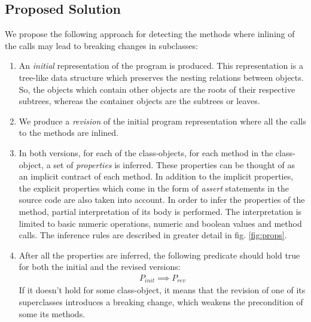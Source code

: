\subsection{Proposed Solution}
We propose the following approach for detecting the methods where inlining of the calls may lead to breaking changes in subclasses:
\begin{enumerate}
    \item An \textit{initial} representation of the program is produced. This representation is a tree-like data structure which preserves the nesting relations between objects. So, the objects which contain other objects are the roots of their respective subtrees, whereas the container objects are the subtrees or leaves.
    \item We produce a \textit{revision} of the initial program representation where all the calls to the methods are inlined.
    \item In both versions, for each of the class-objects, for each method in the class-object, a set of \textit{properties} is inferred.  These properties can be thought of as an implicit contract \cite{meyer} of each method. In addition to the implicit properties, the explicit properties which come in the form of \textit{assert} statements in the source code are also taken into account. In order to infer the properties of the method, partial interpretation of its body is performed. The interpretation is limited to basic numeric operations, numeric and boolean values and method calls. The inference rules are described in greater detail in fig. \ref{fig:props}.
    \item After all the properties are inferred, the following predicate should hold true for both the initial and the revised versions:
          \begin{align}
              P_{init} \implies P_{rev}
              \label{fig:implication}
          \end{align}
          If it doesn't hold for some class-object, it means that the revision of one of its superclasses introduces a breaking change, which weakens the precondition of some its methods.
\end{enumerate}

